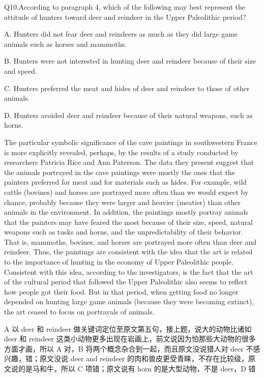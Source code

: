 \begin{blk}
    \begin{qst}
        Q10.According to paragraph 4, which of the following may best represent the attitude of hunters toward deer and reindeer in the Upper Paleolithic period?
    \end{qst}

    \begin{chc}
        A. Hunters did not fear deer and reindeers as much as they did large game animals such as horses and mammoths.

        B. Hunters were not interested in hunting deer and reindeer because of their size and speed.

        C. Hunters preferred the meat and hides of deer and reindeer to those of other animals.

        D. Hunters avoided deer and reindeer because of their natural weapons, such as horns.
    \end{chc}

    \begin{psgq}
        The particular symbolic significance of the cave paintings in southwestern France is more explicitly revealed, perhaps, by the results of a study conducted by researchers Patricia Rice and Ann Paterson. The data they present suggest that the animals portrayed in the cave paintings were mostly the ones that the painters preferred for meat and for materials such as hides. For example, wild cattle (bovines) and horses are portrayed more often than we would expect by chance, probably because they were larger and heavier (meatier) than other animals in the environment. In addition, the paintings mostly portray animals that the painters may have feared the most because of their size, speed, natural weapons such as tusks and horns, and the unpredictability of their behavior. That is, mammoths, bovines, and horses are portrayed more often than deer and reindeer. Thus, the paintings are consistent with the idea that the art is related to the importance of hunting in the economy of Upper Paleolithic people. Consistent with this idea, according to the investigators, is the fact that the art of the cultural period that followed the Upper Paleolithic also seems to reflect how people got their food. But in that period, when getting food no longer depended on hunting large game animals (because they were becoming extinct), the art ceased to focus on portrayals of animals.
    \end{psgq}

    \begin{nlz}
        A 以 deer 和 reindeer 做关键词定位至原文第五句，接上题，说大的动物比诸如 deer 和 reindeer 这类小动物更多出现在岩画上，前文说因为怕那些大动物的很多方面才画，所以 A 对，B 将两个概念杂合到一起，而且原文没说猎人对 deer 不感兴趣，错；原文没说 deer and reindeer 的肉和兽皮更受青睐，不存在比较级，原文说的是马和牛，所以 C 项错；原文说有 horn 的是大型动物，不是 deer，D 错
    \end{nlz}
\end{blk}

